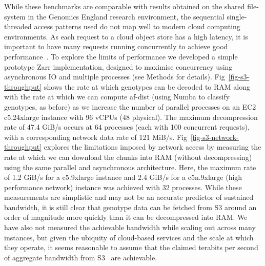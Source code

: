 \documentclass[a4paper,num-refs]{oup-contemporary}
\begin{document}
While these benchmarks are comparable with results obtained on the
shared file-system in the Genomics England research environment,
the sequential single-threaded access patterns used do not map
well to modern cloud computing environments.
As each request to a cloud object store has a high latency, it
is important to have many requests running concurrently to achieve
good performance~\citep{durner2023exploiting}.
To explore the limits of performance we developed a simple prototype
Zarr implementation, designed to maximise concurrency using asynchronous
IO and multiple processes (see Methods for details).
Fig~\ref{fig-s3-throughput} shows the rate at which genotypes
can be decoded to RAM along with the rate at which we can compute
af-dist (using Numba to classify genotypes, as before)
as we increase the number of parallel processes on
an EC2 c5.24xlarge instance with 96 vCPUs (48 physical).
The maximum decompression rate of 47.4 GiB/s
occurs at 64 processes (each with 100 concurrent requests), 
with a corresponding network data rate of 121 MiB/s.
Fig~\ref{fig-s3-network-throughput} explores the limitations imposed by
network access by measuring the rate at which we can download the chunks
into RAM (without decompressing) using the same parallel and asynchronous
architecture. Here, the maximum rate of 1.2 GiB/s for a c5.9xlarge instance
and 2.4 GiB/s for a c5n.9xlarge (high performance network) instance
was achieved with 32 processes. 
While these measurements are simplistic and may not be an 
accurate predictor of sustained bandwidth, it is still clear that 
genotype data can be fetched
from S3 around an order of magnitude more quickly 
than it can be decompressed into RAM. 
We have also not measured
the achievable bandwidth while scaling out across many instances,
but given the ubiquity of cloud-based services and the scale 
at which they operate, it seems reasonable to assume that the claimed
terabits per second of aggregate bandwidth from
S3~\cite{s3-performance-optimising} are achievable.
 
\end{document}
